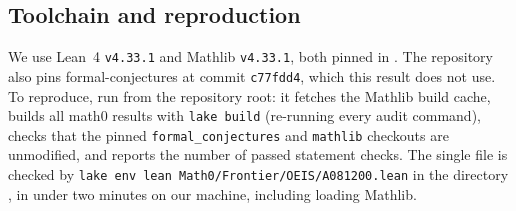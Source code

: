 \documentclass[11pt]{amsart}
\theoremstyle{plain}
\theoremstyle{definition}
\begin{document}
\subsection*{Toolchain and reproduction}
We use Lean~4 \cite{Lean4} \texttt{v4.33.1} and Mathlib \cite{Mathlib} \texttt{v4.33.1}, both pinned in . The repository also pins formal-conjectures \cite{FC} at commit \texttt{c77fdd4}, which this result does not use.
To reproduce, run  from the repository root: it fetches the Mathlib build cache, builds all math0 results with \texttt{lake build} (re-running every audit command), checks that the pinned \texttt{formal\_conjectures} and \texttt{mathlib} checkouts are unmodified, and reports the number of passed statement checks. The single file is checked by \texttt{lake env lean Math0/Frontier/OEIS/A081200.lean} in the directory , in under two minutes on our machine, including loading Mathlib.
\end{document}
